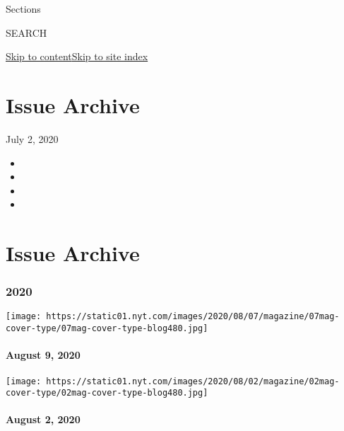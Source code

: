 Sections

SEARCH

\protect\hyperlink{site-content}{Skip to
content}\protect\hyperlink{site-index}{Skip to site index}

\hypertarget{issue-archive}{%
\section{Issue Archive}\label{issue-archive}}

July 2, 2020

\begin{itemize}
\item
\item
\item
\item
\end{itemize}

\hypertarget{issue-archive-1}{%
\section{Issue Archive}\label{issue-archive-1}}

\hypertarget{2020}{%
\subsubsection{2020}\label{2020}}

\href{https://www.nytimes.com/issue/magazine/2020/08/07/the-8920-issue}{}

\texttt{[image: https://static01.nyt.com/images/2020/08/07/magazine/07mag-cover-type/07mag-cover-type-blog480.jpg]}

\hypertarget{august-9-2020}{%
\paragraph{August 9, 2020}\label{august-9-2020}}

\href{https://www.nytimes.com/issue/magazine/2020/07/31/the-8220-issue}{}

\texttt{[image: https://static01.nyt.com/images/2020/08/02/magazine/02mag-cover-type/02mag-cover-type-blog480.jpg]}

\hypertarget{august-2-2020}{%
\paragraph{August 2, 2020}\label{august-2-2020}}

\href{https://www.nytimes.com/issue/magazine/2020/07/24/the-72620-issue}{}

